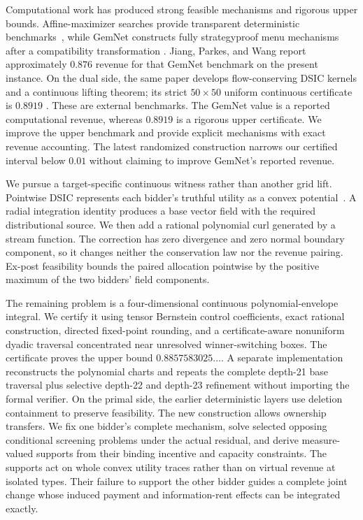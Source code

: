 \documentclass[11pt]{article}
\begin{document}
Computational work has produced strong feasible mechanisms and rigorous upper
bounds.  Affine-maximizer searches provide transparent deterministic
benchmarks~\citep{sandholm2015}, while GemNet constructs fully
strategyproof menu mechanisms after a compatibility transformation
\citep{wang2024gemnet}.  Jiang, Parkes, and Wang report approximately $0.876$
revenue for that GemNet benchmark on the present instance.  On the dual side,
the same paper develops flow-conserving DSIC kernels and a continuous lifting
theorem; its strict $50\times50$ uniform continuous certificate is $0.8919$
\citep{jiang2026duality}.  These are external benchmarks.  The GemNet value is
a reported computational revenue, whereas $0.8919$ is a rigorous upper
certificate.  We improve the upper benchmark and provide explicit mechanisms with exact
revenue accounting. The latest randomized construction narrows our certified
interval below $0.01$ without claiming to improve GemNet's reported revenue.

We pursue a target-specific continuous witness rather than another grid
lift.  Pointwise DSIC represents each bidder's truthful utility as a convex
potential~\citep{rochet1987}.  A radial integration identity produces a base
vector field with the required distributional source.  We then add a
rational polynomial curl generated by a stream function.  The correction has
zero divergence and zero normal boundary component, so it changes neither
the conservation law nor the revenue pairing.  Ex-post feasibility bounds
the paired allocation pointwise by the positive maximum of the two bidders'
field components.

The remaining problem is a four-dimensional continuous polynomial-envelope
integral.  We certify it using tensor Bernstein control coefficients, exact
rational construction, directed fixed-point rounding, and a certificate-aware
nonuniform dyadic traversal concentrated near unresolved winner-switching
boxes.  The certificate proves the upper bound $0.8857583025\ldots$.  A
separate implementation reconstructs the polynomial charts and repeats the
complete depth-21 base traversal plus selective depth-22 and depth-23
refinement without importing the formal verifier.  On the primal side, the earlier deterministic layers use deletion
containment to preserve feasibility. The new construction allows ownership
transfers. We fix one bidder's complete mechanism, solve selected opposing
conditional screening problems under the actual residual, and derive
measure-valued supports from their binding incentive and capacity constraints.
The supports act on whole convex utility traces rather than on virtual
revenue at isolated types. Their failure to support the other bidder guides
a complete joint change whose induced payment and information-rent effects
can be integrated exactly.
\end{document}
